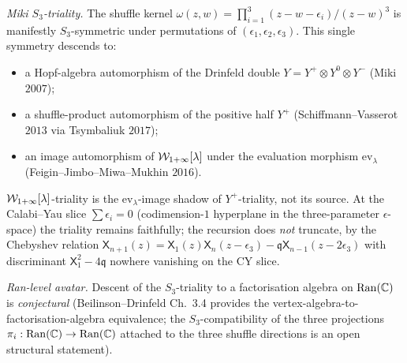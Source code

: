 \begin{theorem}
\emph{Miki $S_3$-triality.} The shuffle kernel
$\omega(z, w) = \prod_{i = 1}^{3}(z - w - \epsilon_i)/(z - w)^3$ is
manifestly $S_3$-symmetric under permutations of $(\epsilon_1,
\epsilon_2, \epsilon_3)$. This single symmetry descends to:
\begin{itemize}
\item a Hopf-algebra automorphism of the Drinfeld double
$Y = Y^+ \otimes Y^0 \otimes Y^-$ (Miki $2007$);
\item a shuffle-product automorphism of the positive half $Y^+$
(Schiffmann--Vasserot $2013$ via Tsymbaliuk $2017$);
\item an image automorphism of $\mathcal{W}_{1+\infty}[\lambda]$ under the
evaluation morphism $\mathrm{ev}_\lambda$ (Feigin--Jimbo--Miwa--Mukhin
$2016$).
\end{itemize}
$\mathcal{W}_{1+\infty}[\lambda]$-triality is the $\mathrm{ev}_\lambda$-image shadow of
$Y^+$-triality, not its source. At the Calabi--Yau slice
$\sum \epsilon_i = 0$ (codimension-$1$ hyperplane in the three-parameter
$\epsilon$-space) the triality remains faithfully; the recursion does
\emph{not} truncate, by the Chebyshev relation
$\mathsf{X}_{n+1}(z) = \mathsf{X}_1(z)\mathsf{X}_n(z - \epsilon_3)
- \mathfrak{q}\mathsf{X}_{n-1}(z - 2\epsilon_3)$
with discriminant $\mathsf{X}_1^2 - 4\mathfrak{q}$ nowhere vanishing
on the CY slice.

\emph{Ran-level avatar.} Descent of the $S_3$-triality to a
factorisation algebra on $\mathrm{Ran}(\mathbb{C})$ is \emph{conjectural}
(Beilinson--Drinfeld Ch.~3.4 provides the vertex-algebra-to-factorisation-algebra
equivalence; the $S_3$-compatibility of the three projections
$\pi_i : \mathrm{Ran}(\mathbb{C}) \to \mathrm{Ran}(\mathbb{C})$ attached to the three
shuffle directions is an open structural statement).
\end{theorem}

